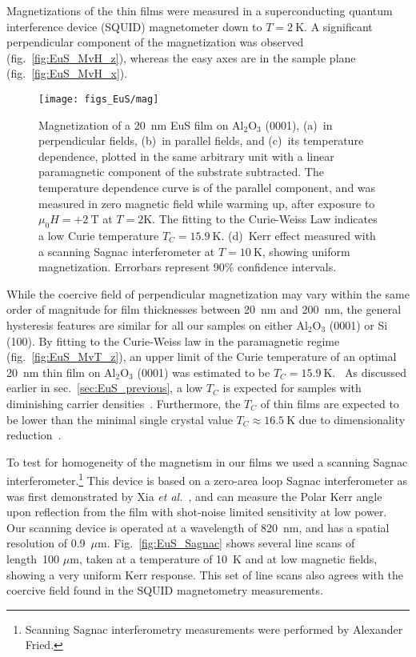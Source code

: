Magnetizations of the thin films were measured in a superconducting quantum interference device (SQUID) magnetometer down to $T=2~\mathrm{K}$. A significant perpendicular component of the magnetization was observed (fig.~\ref{fig:EuS_MvH_z}), whereas the easy axes are in the sample plane (fig.~\ref{fig:EuS_MvH_x}). %
%
\begin{figure}[ht]%
    \subfloat{\label{fig:EuS_MvH_z}}%
    \subfloat{\label{fig:EuS_MvH_x}}%
    \subfloat{\label{fig:EuS_MvT_z}}%
    \subfloat{\label{fig:EuS_Sagnac}}%
    \centering%
    \texttt{[image: figs\_EuS/mag]}%
    \caption[Magnetic properties of EuS thin films]{\label{fig:EuS_magnetic}Magnetization of a 20~nm EuS film on Al$_2$O$_3$ (0001), (a)~in perpendicular fields, (b)~in parallel fields, and (c)~its temperature dependence, plotted in the same arbitrary unit with a linear paramagnetic component of the substrate subtracted. The temperature dependence curve is of the parallel component, and was measured in zero magnetic field while warming up, after exposure to $\mu_0H=+2~\mathrm{T}$ at $T=2\mathrm{K}$. The fitting to the Curie-Weiss Law indicates a low Curie temperature $T_C=15.9~\mathrm{K}$. (d)~Kerr effect measured with a scanning Sagnac interferometer at $T=10~\mathrm{K}$, showing uniform magnetization. Errorbars represent 90\% confidence intervals.}%
\end{figure}%
%
While the coercive field of perpendicular magnetization may vary within the same order of magnitude for film thicknesses between 20~nm and 200~nm, the general hysteresis features are similar for all our samples on either Al$_2$O$_3$ (0001) or Si (100). By fitting to the Curie-Weiss law in the paramagnetic regime (fig.~\ref{fig:EuS_MvT_z}), an upper limit of the Curie temperature of an optimal 20~nm thin film on Al$_2$O$_3$ (0001) was estimated to be $T_C=15.9~\mathrm{K}$.~\cite{Eu_mag_compounds} As discussed earlier in sec.~\ref{sec:EuS_previous}, a low $T_C$ is expected for samples with diminishing carrier densities~\cite{EuS_TC_doping, EuS_ntype, EuX_doped_transport}. Furthermore, the $T_C$ of thin films are expected to be lower than the minimal single crystal value $T_C\approx16.5~\mathrm{K}$ due to dimensionality reduction~\cite{thickness_Tc_theory, thickness_Tc_exp}.

To test for homogeneity of the magnetism in our films we used a scanning Sagnac interferometer.\footnote{Scanning Sagnac interferometry measurements were performed by Alexander Fried.} This device is based on a zero-area loop Sagnac interferometer as was first demonstrated by Xia {\it et al.}~\cite{Xia2006}, and can measure the Polar Kerr angle upon reflection from the film with shot-noise limited sensitivity at low power. Our scanning device is operated at a wavelength of 820~nm, and has a spatial resolution of 0.9~$\mu$m. Fig.~\ref{fig:EuS_Sagnac} shows several line scans of length~100 $\mu$m, taken at a temperature of 10~K and at low magnetic fields, showing a very uniform Kerr response. This set of line scans also agrees with the coercive field found in the SQUID magnetometry measurements.

